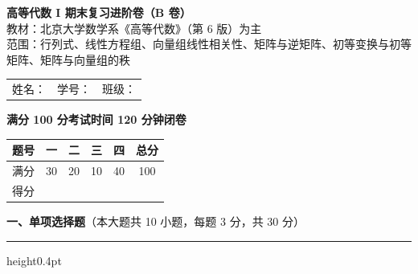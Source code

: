 \documentclass[12pt]{ctexart}
\newcommand{\blank}[1][2.6cm]{\underline{\hspace{#1}}}
\newcommand{\bigsection}[2]{%
  \vspace{7pt}%
  {\noindent\bfseries\large #1}\hfill{\normalsize（本大题共 #2）}\par
  \vspace{2pt}\hrule height0.4pt\vspace{8pt}}
\begin{document}
\begin{center}
  {\Large\bfseries 高等代数 I 期末复习进阶卷（B 卷）}\\[4pt]
  {\small 教材：北京大学数学系《高等代数》（第 6 版）为主\\
  范围：行列式、线性方程组、向量组线性相关性、矩阵与逆矩阵、初等变换与初等矩阵、矩阵与向量组的秩}\\[8pt]
\end{center}

\noindent
\begin{tabular}{@{}p{4.6cm}p{4.6cm}p{4.6cm}@{}}
姓名：\blank[2.8cm] & 学号：\blank[2.8cm] & 班级：\blank[2.8cm]
\end{tabular}

\vspace{6pt}
\noindent\textbf{满分 100 分\qquad 考试时间 120 分钟\qquad 闭卷}

\vspace{8pt}
\noindent
\renewcommand{\arraystretch}{1.4}
\begin{tabular}{|c|c|c|c|c|c|}
\hline
题号 & 一 & 二 & 三 & 四 & 总分 \\\hline
满分 & 30 & 20 & 10 & 40 & 100 \\\hline
得分 & & & & & \\\hline
\end{tabular}

\vspace{12pt}

\bigsection{一、单项选择题}{10 小题，每题 3 分，共 30 分}
\end{document}
